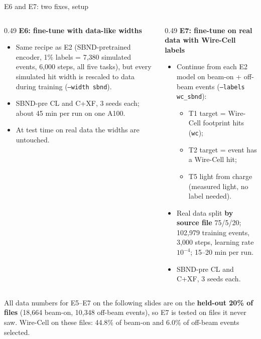 \documentclass[aspectratio=169,10pt]{beamer}
\newcommand{\code}[1]{\texttt{#1}}
\begin{document}
\begin{frame}{E6 and E7: two fixes, setup}
  \footnotesize
  \begin{columns}[T]
    \begin{column}{0.49\textwidth}
      \textbf{E6: fine-tune with data-like widths}
      \begin{itemize}\setlength{\itemsep}{3pt}
        \item Same recipe as E2 (SBND-pretrained encoder, 1\% labels = 7,380 simulated events, 6,000 steps, all five tasks), but every
          simulated hit width is rescaled to data during training (\code{--width sbnd}).
        \item SBND-pre CL and C+XF, 3 seeds each; about 45 min per run on one A100.
        \item At test time on real data the widths are untouched.
      \end{itemize}
    \end{column}
    \begin{column}{0.49\textwidth}
      \textbf{E7: fine-tune on real data with Wire-Cell labels}
      \begin{itemize}\setlength{\itemsep}{3pt}
        \item Continue from each E2 model on beam-on + off-beam events (\code{--labels wc\_sbnd}):
          \begin{itemize}
            \item T1 target = Wire-Cell footprint hits (\code{wc});
            \item T2 target = event has a Wire-Cell hit;
            \item T5 light from charge (measured light, no label needed).
          \end{itemize}
        \item Real data split \textbf{by source file} 75/5/20; 102,979 training events, 3,000 steps, learning rate $10^{-4}$;
          15--20 min per run.
        \item SBND-pre CL and C+XF, 3 seeds each.
      \end{itemize}
    \end{column}
  \end{columns}
  \vspace{6pt}
  \raggedright
  All data numbers for E5--E7 on the following slides are on the \textbf{held-out 20\% of files} (18,664 beam-on, 10,348 off-beam events),
  so E7 is tested on files it never saw. Wire-Cell on these files: 44.8\% of beam-on and 6.0\% of off-beam events selected.
\end{frame}
\end{document}
